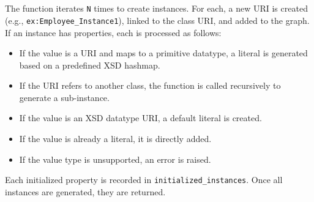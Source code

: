 \\
\\
The function iterates \texttt{N} times to create instances. For each, a new URI is created (e.g., \texttt{ex:Employee\_Instance1}), linked to the class URI, and added to the graph. If an instance has properties, each is processed as follows:
\begin{itemize}
    \item If the value is a URI and maps to a primitive datatype, a literal is generated based on a predefined XSD hashmap.
    \item If the URI refers to another class, the function is called recursively to generate a sub-instance.
    \item If the value is an XSD datatype URI, a default literal is created.
    \item If the value is already a literal, it is directly added.
    \item If the value type is unsupported, an error is raised.
\end{itemize}
Each initialized property is recorded in \texttt{initialized\_instances}. Once all instances are generated, they are returned.


